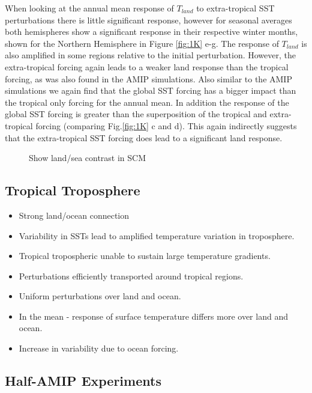 When looking at the annual mean response of $T_{land}$ to extra-tropical SST 
perturbations there is little significant response, however for seasonal 
averages both hemispheres show a significant response in their respective winter 
months, shown for the Northern Hemisphere in Figure \ref{fig:1K} e-g. The 
response of $T_{land}$ is also amplified in some regions relative to the initial 
perturbation.  However, the extra-tropical forcing again leads to a weaker land 
response than the tropical forcing, as was also found in the AMIP simulations.  
Also similar to the AMIP simulations we again find that the  global SST forcing 
has a bigger impact than the tropical only forcing for the annual mean. In 
addition the response of the global SST forcing is greater than the 
superposition of the tropical and extra-tropical forcing (comparing 
Fig.\ref{fig:1K} c and d).  This again indirectly suggests that the 
extra-tropical SST forcing does lead to a significant land response.

\begin{figure}[H]
	\caption{Show land/sea contrast in SCM}
\label{fig:SCM_Rlo}
\end{figure}

\subsection{Tropical Troposphere}
\begin{itemize}
	\item Strong land/ocean connection
	\item Variability in SSTs lead to amplified temperature variation in 
		troposphere.
	\item Tropical tropospheric unable to sustain large temperature gradients.
	\item Perturbations efficiently transported around tropical regions.
	\item Uniform perturbations over land and ocean.
	\item In the mean - response of surface temperature differs more over land 
		and ocean.
	\item Increase in variability due to ocean forcing.
\end{itemize}

\subsection{Half-AMIP Experiments}

